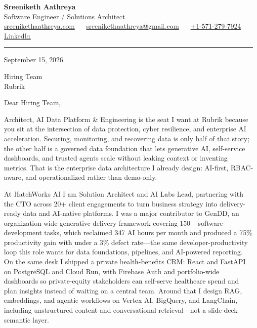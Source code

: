 \documentclass[11pt, letterpaper]{article}
\begin{document}
{\fontsize{18 pt}{20 pt}\selectfont\bfseries Sreeniketh Aathreya}\\[4pt]
Software Engineer / Solutions Architect\\[6pt]
\href{https://sreenikethaathreya.com}{sreenikethaathreya.com}
~\textbullet~
\href{mailto:sreenikethaathreya@gmail.com}{sreenikethaathreya@gmail.com}
~\textbullet~
\href{tel:+1-571-279-7924}{+1-571-279-7924}
~\textbullet~
\href{https://www.linkedin.com/in/sreeniketh-aathreya-16800b122/}{LinkedIn}

\vspace{12pt}
\hrule
\vspace{12pt}

September 15, 2026

\vspace{8pt}

Hiring Team\\
Rubrik

\vspace{12pt}

Dear Hiring Team,

Architect, AI Data Platform \& Engineering is the seat I want at Rubrik because you sit at the intersection of data protection, cyber resilience, and enterprise AI acceleration. Securing, monitoring, and recovering data is only half of that story; the other half is a governed data foundation that lets generative AI, self-service dashboards, and trusted agents scale without leaking context or inventing metrics. That is the enterprise data architecture I already design: AI-first, RBAC-aware, and operationalized rather than demo-only.

At HatchWorks AI I am Solution Architect and AI Labs Lead, partnering with the CTO across 20+ client engagements to turn business strategy into delivery-ready data and AI-native platforms. I was a major contributor to GenDD, an organization-wide generative delivery framework covering 150+ software-development tasks, which reclaimed 347 AI hours per month and produced a 75\% productivity gain with under a 3\% defect rate---the same developer-productivity loop this role wants for data foundations, pipelines, and AI-powered reporting. On the same desk I shipped a private health-benefits CRM: React and FastAPI on PostgreSQL and Cloud Run, with Firebase Auth and portfolio-wide dashboards so private-equity stakeholders can self-serve healthcare spend and plan insights instead of waiting on a central team. Around that I design RAG, embeddings, and agentic workflows on Vertex AI, BigQuery, and LangChain, including unstructured content and conversational retrieval---not a slide-deck semantic layer.
\end{document}
